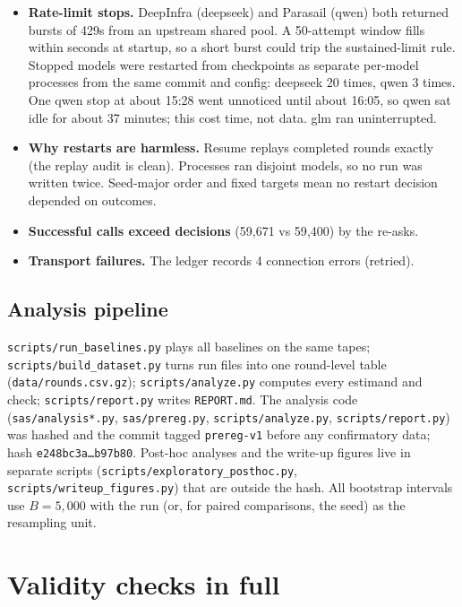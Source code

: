 \documentclass[11pt,letterpaper]{article}
\numberwithin{equation}{section}
\numberwithin{table}{section}
\numberwithin{figure}{section}
\numberwithin{algorithm}{section}
\begin{document}
\begin{itemize}
  \item \textbf{Rate-limit stops.} DeepInfra (deepseek) and Parasail (qwen) both returned bursts of 429s from an upstream shared pool. A 50-attempt window fills within seconds at startup, so a short burst could trip the sustained-limit rule. Stopped models were restarted from checkpoints as separate per-model processes from the same commit and config: deepseek 20 times, qwen 3 times. One qwen stop at about 15:28 went unnoticed until about 16:05, so qwen sat idle for about 37 minutes; this cost time, not data. glm ran uninterrupted.
  \item \textbf{Why restarts are harmless.} Resume replays completed rounds exactly (the replay audit is clean). Processes ran disjoint models, so no run was written twice. Seed-major order and fixed targets mean no restart decision depended on outcomes.
  \item \textbf{Successful calls exceed decisions} (59{,}671 vs 59{,}400) by the re-asks.
  \item \textbf{Transport failures.} The ledger records 4 connection errors (retried).
\end{itemize}

\subsection{Analysis pipeline}

\texttt{scripts/run\_baselines.py} plays all baselines on the same tapes; \texttt{scripts/build\_dataset.py} turns run files into one round-level table (\texttt{data/rounds.csv.gz}); \texttt{scripts/analyze.py} computes every estimand and check; \texttt{scripts/report.py} writes \texttt{REPORT.md}. The analysis code (\texttt{sas/analysis*.py}, \texttt{sas/prereg.py}, \texttt{scripts/analyze.py}, \texttt{scripts/report.py}) was hashed and the commit tagged \texttt{prereg-v1} before any confirmatory data; hash \texttt{e248bc3a\ldots b97b80}. Post-hoc analyses and the write-up figures live in separate scripts (\texttt{scripts/exploratory\_posthoc.py}, \texttt{scripts/writeup\_figures.py}) that are outside the hash. All bootstrap intervals use $B=5{,}000$ with the run (or, for paired comparisons, the seed) as the resampling unit.

\section{Validity checks in full}\label{app:validity}
\end{document}
